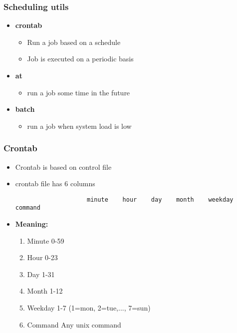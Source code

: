 \documentclass{report}
\begin{document}
    \bigbreak \noindent 
    \subsubsection{Scheduling utils}
    \begin{itemize}
        \item \textbf{crontab}
            \begin{itemize}
                \item Run a job based on a schedule
                \item Job is executed on a periodic basis
            \end{itemize}
        \item \textbf{at}
            \begin{itemize}
                \item run a job some time in the future
            \end{itemize}
        \item \textbf{batch}
            \begin{itemize}
                \item run a job when system load is low
            \end{itemize}
    \end{itemize}

    \bigbreak \noindent 
    \subsubsection{Crontab}
    \begin{itemize}
        \item Crontab is based on control file
        \item crontab file has 6 columns
            \begin{center}
                \begin{verbatim}
                    minute    hour    day    month    weekday    command
                \end{verbatim}
            \end{center}
        \item \textbf{Meaning:}
            \begin{enumerate}
                \item Minute 0-59
                \item Hour 0-23
                \item Day 1-31
                \item Month 1-12
                \item Weekday 1-7 (1=mon, 2=tue,..., 7=sun)
                \item Command Any unix command
            \end{enumerate}
    \end{itemize}
    \bigbreak \noindent 
    \bigbreak \noindent 
\end{document}
